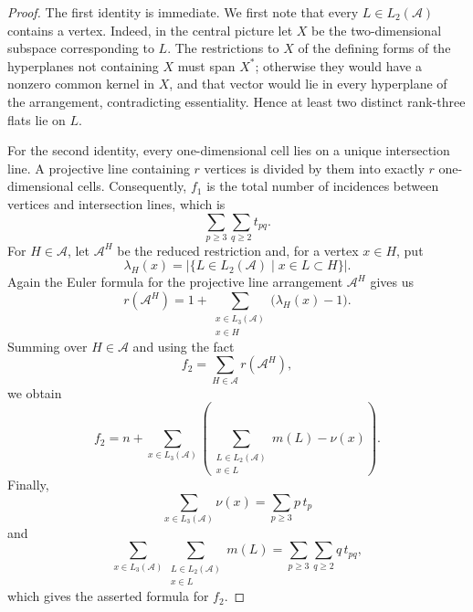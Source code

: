 \documentclass[10pt,a4paper]{amsart}
\newcommand{\cA}{\mathcal A}
\begin{document}
\begin{proof}
The first identity is immediate. We first note that every
$L\in L_2(\cA)$ contains a vertex. Indeed, in the central picture let
$X$ be the two-dimensional subspace corresponding to $L$. The
restrictions to $X$ of the defining forms of the hyperplanes not
containing $X$ must span $X^*$; otherwise they would have a nonzero
common kernel in $X$, and that vector would lie in every hyperplane of
the arrangement, contradicting essentiality. Hence at least two
distinct rank-three flats lie on $L$.

For the second identity, every one-dimensional cell lies on a unique
intersection line. A projective line containing $r$ vertices is divided
by them into exactly $r$ one-dimensional cells.
Consequently, $f_1$ is the total number of incidences between vertices
and intersection lines, which is
\[
\sum_{p\geq 3}\sum_{q\geq 2}t_{pq}.
\]
For $H\in\cA$, let $\cA^H$ be the reduced restriction and, for a vertex
$x\in H$, put
\[
\lambda_H(x)
=
\bigl|\{L\in L_2(\cA)\mid x\in L\subset H\}\bigr|.
\]
Again the Euler formula for the projective line arrangement $\cA^H$ gives us
\[
r(\cA^H)
=
1+
\sum_{\substack{x\in L_3(\cA)\\x\in H}}
\bigl(\lambda_H(x)-1\bigr).
\]
Summing over $H\in\cA$ and using the fact
\[
f_2=\sum_{H\in\cA}r(\cA^H),
\]
we obtain
\[
f_2
=
n+
\sum_{x\in L_3(\cA)}
\left(
\sum_{\substack{L\in L_2(\cA)\\x\in L}}m(L)-\nu(x)
\right).
\]
Finally,
\[
\sum_{x\in L_3(\cA)}\nu(x)
=
\sum_{p\geq 3}p\,t_p
\]
and
\[
\sum_{x\in L_3(\cA)}
\sum_{\substack{L\in L_2(\cA)\\x\in L}}m(L)
=
\sum_{p\geq 3}\sum_{q\geq 2}q\,t_{pq},
\]
which gives the asserted formula for $f_2$.
\end{proof}
\end{document}
